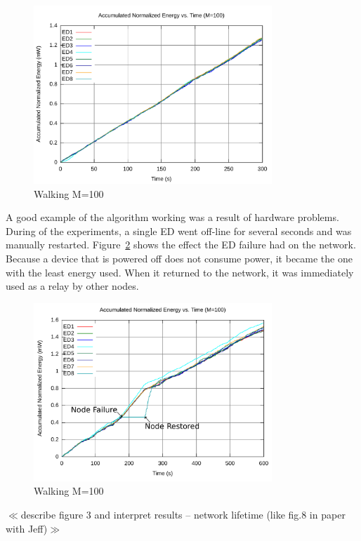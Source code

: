 \documentclass{article}
\begin{document}
\begin{figure}[!ht]
\includegraphics[width=0.8\textwidth]{figures/walk2-c100.pdf}
\caption{Walking M=100}
\label{fig:walk2-c100}
\end{figure}

A good example of the algorithm working was a result of hardware problems. During of the experiments, a single ED went off-line for several seconds and was manually restarted. Figure~\ref{fig:walk4-c100} shows the effect the ED failure had on the network. Because a device that is powered off does not consume power, it became the one with the least energy used. When it returned to the network, it was immediately used as a relay by other nodes. 

\begin{figure}[!ht]
\includegraphics[width=0.8\textwidth]{figures/walk4-c100.pdf}
\caption{Walking M=100}
\label{fig:walk4-c100}
\end{figure}


$\ll$describe figure  3 and interpret results – network lifetime (like fig.8 in paper with Jeff)$\gg$ 
\end{document}
